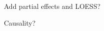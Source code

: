 \documentclass[12pt]{article}
\newcommand{\todo}[1]{{\bf\em TODO:} {{\color{red}{#1}}}}
\newcommand{\spd}{\fontfamily{cmr}\textsc{\small StratPD}}
\begin{document}
{\color{red} Add partial effects and LOESS?}

{\color{red} Causality?}






%
%
%
%
%
%
%
%
%
 
\end{document}
